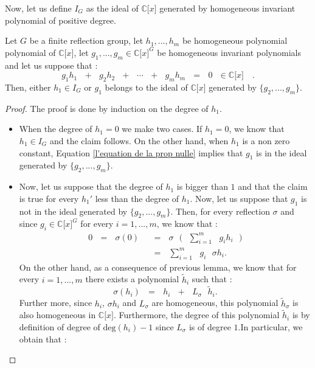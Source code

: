\documentclass[envcountsame,envcountchap]{svmono}
\newcommand{\C}{\mathbb C}
\newcommand{\lb}{\lbrack}
\newcommand{\rb}{\rbrack}
\newcommand{\s}[2]{\sum\limits_{#1}^{#2}}
\newcommand{\q}{\quad}
\newcommand{\qq}{\text{ }}
\begin{document}
Now, let us define $I_G$ as the ideal of $\C\lb x\rb$ generated by homogeneous invariant polynomial of positive degree. 

\begin{proposition}
	Let $G$ be a finite reflection group, let $h_1,...,h_m$ be homogeneous polynomial polynomial of $\C \lb x\rb$, let $ g_1,...,g_m\in \C \lb x\rb^G$ be homogeneous invariant polynomials and let us suppose that :
	\begin{equation}\label{l'equation de la prop nulle}
	g_1 h_1 \qq+\qq g_2 h_2\qq+\qq \cdots \qq +\qq  g_m h_m \qq=\qq 0\qq \in \C  \lb x\rb\q.
	\end{equation} 
	Then, either $h_1\in I_G$ or $g_1$ belongs to the ideal of $\C \lb x\rb$ generated by $\{g_2,..., g_m\}$.
\end{proposition}
\begin{proof}
	The proof is done by induction on the degree of $h_1$.
	\begin{itemize}
		\item When the degree of $h_1=0$ we make two cases. If $h_1=0$, we know that $h_1\in I_G$ and the claim follows. On the other hand, when $h_1$ is a non zero constant, Equation \ref{l'equation de la prop nulle} implies that $g_1$ is in the ideal generated by $\{g_2,...,g_m\}$. 
		\item Now, let us suppose that the degree of $h_1$ is bigger than $1$ and that the claim is true for every $h_1'$ less than the degree of $h_1$. Now, let us suppose that $g_1$ is not in the ideal generated by $\{g_2,...,g_m\}$. Then, for every reflection $\sigma$ and since $g_i\in \C \lb x\rb^G $ for every $i=1,..., m$, we know that :
		\begin{equation}
		\begin{split}
		0\qq=\qq \sigma (0)\qq&=\qq \sigma \qq \bigg(\qq \s{i=1}{m}\qq g_i h_i \qq \bigg)\\
		&=\qq \s{i=1}{m}\qq g_i \qq \sigma h_i.
		\end{split}
		\end{equation}
		On the other hand, as a consequence of previous lemma, we know that for every $i=1,..., m$ there exists a polynomial $\tilde{h}_i$ such that :
		\begin{equation}
		\sigma(h_i)\qq=\qq h_i\qq +\qq L_\sigma \qq \tilde{h}_i.
		\end{equation}
		Further more, since $h_i$, $\sigma h_i$ and $L_\sigma$ are homogeneous, this polynomial $\tilde{h}_\sigma$ is also homogeneous in $\C \lb x\rb$. Furthermore, the degree of this polynomial $\tilde{h}_i$ is by definition of degree of $\mbox{deg}(h_i)-1$ since $L_\sigma$ is of degree $1$.In particular, we obtain that :

\end{itemize}
\end{proof}
\end{document}
